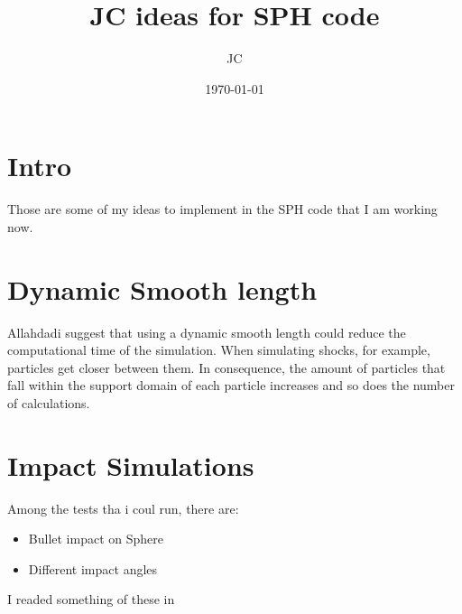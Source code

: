 \documentclass[12pt]{article}
\title{JC ideas for SPH code}
\date{\today}
\author{JC}
\begin{document}
\maketitle
\tableofcontents

\section{Intro}
Those are some of my ideas to implement in the SPH code that I am working now.

\section{Dynamic Smooth length}
Allahdadi\cite{allahdadi93} suggest that using a dynamic smooth length could reduce the computational time of the simulation. When simulating shocks, for example, particles get closer between them. In consequence, the amount of particles that fall within the support domain of each particle increases and so does the number of calculations.

\section{Impact Simulations}
Among the tests tha i coul run, there are:
\begin{itemize}
\item Bullet impact on Sphere
\item Different impact angles
\end{itemize}
I readed something of these in \cite{benz95}



\end{document}
